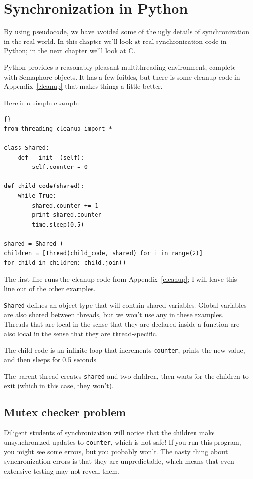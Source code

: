 \documentclass{book}
\begin{document}
\chapter{Synchronization in Python}
\label{pysync}

By using pseudocode, we have avoided some of the ugly
details of synchronization in the real world.  In this chapter
we'll look at real synchronization code in Python; in the
next chapter we'll look at C.

Python provides a reasonably pleasant multithreading environment,
complete with Semaphore objects.  It has
a few foibles, but there is some cleanup code in Appendix~\ref{cleanup}
that makes things a little better.

Here is a simple example:

\begin{lstlisting}[title={}]{}
from threading_cleanup import *

class Shared:
    def __init__(self):
        self.counter = 0

def child_code(shared):
    while True:
        shared.counter += 1
        print shared.counter
        time.sleep(0.5)

shared = Shared()
children = [Thread(child_code, shared) for i in range(2)]
for child in children: child.join()
\end{lstlisting}

The first line runs the cleanup code from Appendix~\ref{cleanup};
I will leave this line out of the other examples.

{\tt Shared} defines an object type that will contain shared variables.
Global variables are also shared between threads, but we won't
use any in these examples.  Threads that are local in the sense
that they are declared inside a function are also local in the
sense that they are thread-specific.

The child code is an infinite loop that increments {\tt counter},
prints the new value, and then sleeps for 0.5 seconds.

The parent thread creates {\tt shared} and two children,
then waits for the children to exit (which in this case, they won't).

\section{Mutex checker problem}

Diligent students of synchronization will notice that the
children make unsynchronized updates to {\tt counter}, which
is not safe!  If you run this program, you might see some
errors, but you probably won't.  The nasty thing about synchronization
errors is that they are unpredictable, which means that even
extensive testing may not reveal them.
\end{document}
